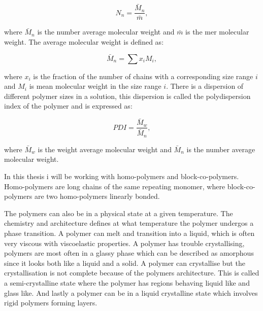 \documentclass[MasterThesisMain.tex]{subfiles}
\begin{document}
\begin{equation}
N_n = \frac{\bar{M}_n}{\bar{m}},
\end{equation}

where $\bar{M}_n$ is the number average molecular weight and $\bar{m}$ is the mer molecular weight. The average molecular weight is defined as:

\begin{equation}
\bar{M}_n = \sum x_iM_i,
\end{equation}      

where $x_i$ is the fraction of the number of chains with a corresponding size range $i$ and $M_i$ is mean molecular weight in the size range $i$. There is a dispersion of different polymer sizes in a solution, this dispersion is called the polydispersion index of the polymer and is expressed as:

\begin{equation}
PDI = \frac{\bar{M}_w}{\bar{M}_n},
\end{equation} 

where $\bar{M}_w$ is the weight average molecular weight and $\bar{M}_n$ is the number average molecular weight.

In this thesis i will be working with homo-polymers and block-co-polymers. Homo-polymers are long chains of the same repeating monomer, where block-co-polymers are two homo-polymers linearly bonded.

The polymers can also be in a physical state at a given temperature. The chemistry and architecture defines at what temperature the polymer undergos a phase transition. A polymer can melt and transition into a liquid, which is often very viscous with viscoelastic properties. A polymer has trouble crystallising, polymers are most often in a glassy phase which can be described as amorphous since it looks both like a liquid and a solid. A polymer can crystallise but the crystallisation is not complete because of the polymers architecture. This is called a semi-crystalline state where the polymer has regions behaving liquid like and glass like. And lastly a polymer can be in a liquid crystalline state which involves rigid polymers forming layers. 
\end{document}
